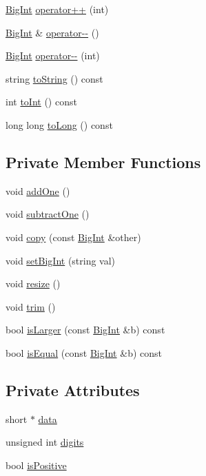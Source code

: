 \begin{DoxyCompactItemize}
\item 
\hyperlink{class_big_int}{Big\+Int} \hyperlink{class_big_int_a7120696c07c413340246a61eb209a541}{operator++} (int)
\item 
\hyperlink{class_big_int}{Big\+Int} \& \hyperlink{class_big_int_aed992537fac59f8c794fc24d10baf199}{operator-\/-\/} ()
\item 
\hyperlink{class_big_int}{Big\+Int} \hyperlink{class_big_int_a6ef5639e9f2cb2226f8611bb39c6c663}{operator-\/-\/} (int)
\item 
string \hyperlink{class_big_int_a947ea3d85937c212c75f58da26e41d00}{to\+String} () const 
\item 
int \hyperlink{class_big_int_a8c5832ca4c93be36a01a0683ed9b9d87}{to\+Int} () const 
\item 
long long \hyperlink{class_big_int_a1a6a8a6deeda3f57b27566027e3c2d4d}{to\+Long} () const 
\end{DoxyCompactItemize}
\subsection*{Private Member Functions}
\begin{DoxyCompactItemize}
\item 
void \hyperlink{class_big_int_a061d5ed012a04d6646c9a6a0e10da544}{add\+One} ()
\item 
void \hyperlink{class_big_int_a4baef860c6adb34f670a868db7fc4482}{subtract\+One} ()
\item 
void \hyperlink{class_big_int_a2881bf9fd6f9310cef0853036d89f8a1}{copy} (const \hyperlink{class_big_int}{Big\+Int} \&other)
\item 
void \hyperlink{class_big_int_a896d3c59d3c4f1e0435d21b2bf50169f}{set\+Big\+Int} (string val)
\item 
void \hyperlink{class_big_int_a4d6ffd94b538c45fa3c4c02e625ba7b7}{resize} ()
\item 
void \hyperlink{class_big_int_a292c19c73cf1198bfb3f64ca093651d2}{trim} ()
\item 
bool \hyperlink{class_big_int_a0963adebab02961555382704df42d708}{is\+Larger} (const \hyperlink{class_big_int}{Big\+Int} \&b) const 
\item 
bool \hyperlink{class_big_int_a5429df4fc70cb4f4af675d4d64280f71}{is\+Equal} (const \hyperlink{class_big_int}{Big\+Int} \&b) const 
\end{DoxyCompactItemize}
\subsection*{Private Attributes}
\begin{DoxyCompactItemize}
\item 
short $\ast$ \hyperlink{class_big_int_af181978224e5a90c5dbd4cbcd3d80379}{data}
\item 
unsigned int \hyperlink{class_big_int_ae040004d15aa6792d2ee62e0aeabb24b}{digits}
\item 
bool \hyperlink{class_big_int_aff7539a3ecc2cbc8ab3117ed40f4352c}{is\+Positive}
\end{DoxyCompactItemize}
